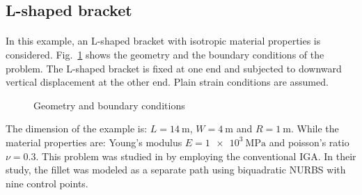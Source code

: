 \subsection{L-shaped bracket}
\label{subsection:l_shaped_bracket}
\paragraph{}
In this example, an L-shaped bracket with isotropic material properties is considered.
Fig.~\ref{iso_fig:l_with_fillet_geo_bc} shows the geometry and the boundary conditions of the problem.
The L-shaped bracket is fixed at one end and subjected to downward vertical displacement at the other end.
Plain strain conditions are assumed.
    \begin{figure}[h!]
        \centering
        \caption{Geometry and boundary conditions} 
        \label{iso_fig:l_with_fillet_geo_bc}         
    \end{figure}
%
The dimension of the example is: $L=\SI{14}{\meter}$, $W=\SI{4}{\meter}$ and $R=\SI{1}{\meter}$.
While the material properties are: Young's modulus $E=\SI{1e3}{\mega\pascal}$ and poisson's ratio $\nu=0.3$.
This problem was studied in \citep{LIPTON2010357} by employing the conventional IGA.
In their study, the fillet was modeled as a separate path using biquadratic NURBS with nine control points.

